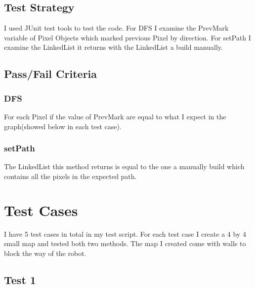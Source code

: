 \documentclass[11pt, a4paper]{report}
\begin{document}
\section{Test Strategy}
I used JUnit test tools to test the code. For DFS I examine the PrevMark variable of Pixel Objects which marked previous Pixel by direction. For setPath I examine the LinkedList it returns with the LinkedList a build manually.

\section{Pass/Fail Criteria}
\subsection{DFS}
For each Pixel if the value of PrevMark are equal to what I expect in the graph(showed below in each test case).

\subsection{setPath}
The LinkedList this method returns is equal to the one a manually build which contains all the pixels in the expected path.




\chapter{Test Cases} 
I have 5 test cases in total in my test script. For each test case I create a 4 by 4 small map and tested both two methods. The map I created come with walls to block the way of the robot.

\section{Test 1}
\end{document}
